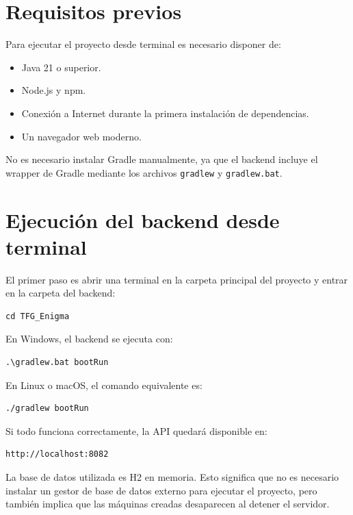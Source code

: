 \section{Requisitos previos}

Para ejecutar el proyecto desde terminal es necesario disponer de:

\begin{itemize}
	\item Java 21 o superior.
	\item Node.js y npm.
	\item Conexión a Internet durante la primera instalación de dependencias.
	\item Un navegador web moderno.
\end{itemize}

No es necesario instalar Gradle manualmente, ya que el backend incluye el wrapper de Gradle mediante los archivos \texttt{gradlew} y \texttt{gradlew.bat}.

\section{Ejecución del backend desde terminal}

El primer paso es abrir una terminal en la carpeta principal del proyecto y entrar en la carpeta del backend:

\begin{lstlisting}
cd TFG_Enigma
\end{lstlisting}

En Windows, el backend se ejecuta con:

\begin{lstlisting}
.\gradlew.bat bootRun
\end{lstlisting}

En Linux o macOS, el comando equivalente es:

\begin{lstlisting}
./gradlew bootRun
\end{lstlisting}

Si todo funciona correctamente, la API quedará disponible en:

\begin{lstlisting}
http://localhost:8082
\end{lstlisting}

La base de datos utilizada es H2 en memoria. Esto significa que no es necesario instalar un gestor de base de datos externo para ejecutar el proyecto, pero también implica que las máquinas creadas desaparecen al detener el servidor.

